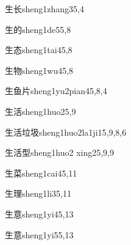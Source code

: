 \begin{verbete}{生长}{sheng1zhang3}{5,4}
\end{verbete}

\begin{verbete}{生的}{sheng1de5}{5,8}
\end{verbete}

\begin{verbete}{生态}{sheng1tai4}{5,8}
\end{verbete}

\begin{verbete}{生物}{sheng1wu4}{5,8}
\end{verbete}

\begin{verbete}{生鱼片}{sheng1yu2pian4}{5,8,4}
\end{verbete}

\begin{verbete}{生活}{sheng1huo2}{5,9}
\end{verbete}

\begin{verbete}{生活垃圾}{sheng1huo2la1ji1}{5,9,8,6}
\end{verbete}

\begin{verbete}{生活型}{sheng1huo2 xing2}{5,9,9}
\end{verbete}

\begin{verbete}{生菜}{sheng1cai4}{5,11}
\end{verbete}

\begin{verbete}{生理}{sheng1li3}{5,11}
\end{verbete}

\begin{verbete}{生意}{sheng1yi4}{5,13}
\end{verbete}

\begin{verbete}{生意}{sheng1yi5}{5,13}
\end{verbete}

